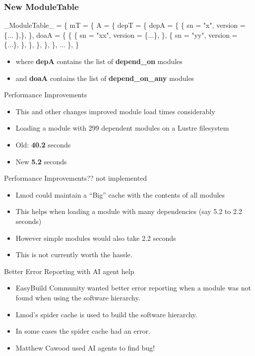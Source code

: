 \documentclass[aspectratio=169]{beamer}
\begin{document}
\begin{frame}[fragile]
    \frametitle{New ModuleTable}
 {\small
    \begin{semiverbatim}
_ModuleTable_ = \{
  mT = \{
    A = \{
      depT = \{
        depA = \{ \{ sn = "x", version = \{... \},\}, \},
        doaA = \{ \{
            \{ sn = "xx", version = \{...\}, \},
            \{ sn = "yy", version = \{...\}, \},
          \}, \}, \}, \},
    ...
  \},
\}
    \end{semiverbatim}
}
  \begin{itemize}
    \item where \textbf{depA} contains the list of \textbf{depend\_on} modules
    \item and \textbf{doaA} contains the list of \textbf{depend\_on\_any} modules
  \end{itemize}

\end{frame}

\begin{frame}{Performance Improvements}
  \begin{itemize}
    \item This and other changes improved module load times
      considerably
    \item Loading a module with 299 dependent modules on a Lustre
      filesystem
    \item Old: \textbf{40.2} seconds
    \item New \textbf{5.2} seconds
  \end{itemize}
\end{frame}

\begin{frame}{Performance Improvements?? not implemented}
  \begin{itemize}
    \item Lmod could maintain a ``Big'' cache with the contents of all
      modules
    \item This helps when loading a module with many dependencies (say
      5.2 to 2.2 seconds)
    \item However simple modules would also take 2.2 seconds
    \item This is not currently worth the hassle.
  \end{itemize}
\end{frame}

\begin{frame}{Better Error Reporting with AI agent help }
  \begin{itemize}
    \item EasyBuild Community wanted better error reporting when a
      module was not found when using the software hierarchy.
    \item Lmod's spider cache is used to build the software hierarchy.
    \item In some cases the spider cache had an error.
    \item Matthew Cawood used AI agents to find bug!
  \end{itemize}
\end{frame}
\end{document}
